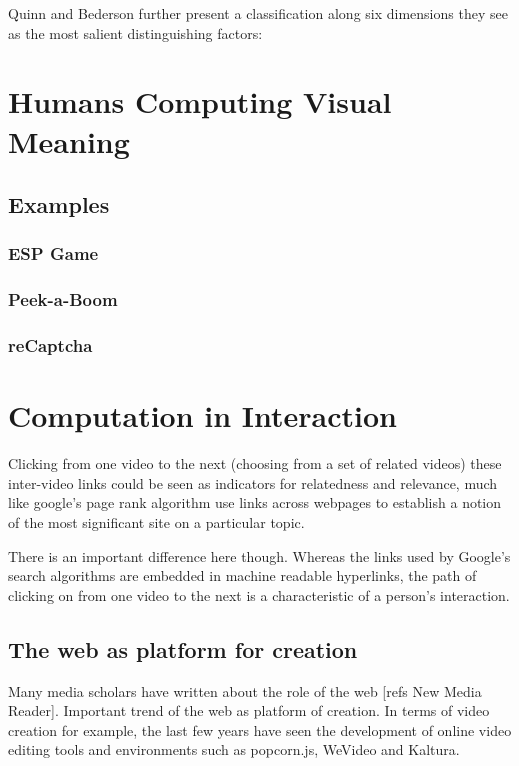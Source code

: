 Quinn and Bederson further present a classification along six dimensions they see as the most salient distinguishing factors: \cite{Quinn:2011us}


\section{Humans Computing Visual Meaning}
\subsection{Examples}
\subsubsection{ESP Game}
\subsubsection{Peek-a-Boom}
\subsubsection{reCaptcha}




\section{Computation in Interaction}


Clicking from one video to the next (choosing from a set of related videos)
these inter-video links could be seen as indicators for relatedness and relevance, much like google's page rank algorithm use links across webpages to establish a notion of the most significant site on a particular topic. 

There is an important difference here though. Whereas the links used by Google's search algorithms are embedded in machine readable hyperlinks, the path of clicking on from one video to the next is a characteristic of a person's interaction. 




\subsection{The web as platform for creation}
\label{sec:platform}
Many media scholars have written about the role of the web [refs New Media Reader].
Important trend of the web as platform of creation. In terms of video creation for example, the last few years have seen the development of online video editing tools and environments such as popcorn.js, WeVideo and Kaltura.



